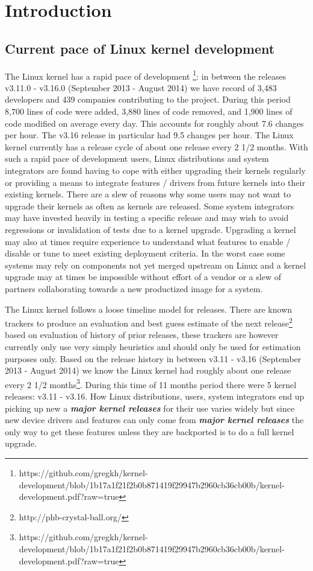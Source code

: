 \section{Introduction}



\subsection{Current pace of Linux kernel development}

The Linux kernel has a rapid pace of development
\footnote{https://github.com/gregkh/kernel-development/blob/1b17a1f21f2b0b871419f29947b2960cb36cb00b/kernel-development.pdf?raw=true}:
in between the releases v3.11.0 - v3.16.0 (September 2013 - August 2014) we
have record of 3,483 developers and 439 companies contributing to the project.
During this period 8,700 lines of code were added, 3,880 lines of code removed,
and 1,900 lines of code modified on average every day. This accounts for
roughly about 7.6 changes per hour. The v3.16 release in particular had 9.5
changes per hour. The Linux kernel currently has a release cycle of about one
release every 2 1/2 months. With such a rapid pace of development users, Linux
distributions and system integrators are found having to cope with either
upgrading their kernels regularly or providing a means to integrate features /
drivers from future kernels into their existing kernels. There are a slew of
reasons why some users may not want to upgrade their kernels as often as
kernels are released. Some system integrators may have invested heavily in
testing a specific release and may wish to avoid regressions or invalidation of
tests due to a kernel upgrade.  Upgrading a kernel may also at times require
experience to understand what features to enable / disable or tune to meet
existing deployment criteria. In the worst case some systems may rely on
components not yet merged upstream on Linux and a kernel upgrade may at times
be impossible without effort of a vendor or a slew of partners collaborating
towards a new productized image for a system.

The Linux kernel follows a loose timeline model for releases. There are known
trackers to produce an evaluation and best guess estimate of the next
release\footnote{http://phb-crystal-ball.org/} based on evaluation of history
of prior releases, these trackers are however currently only use very simply
heuristics and should only be used for estimation purposes only. Based on the
release history in between v3.11 - v3.16  (September 2013 - August 2014) we
know the Linux kernel had roughly about one release every 2 1/2
months\footnote{https://github.com/gregkh/kernel-development/blob/1b17a1f21f2b0b871419f29947b2960cb36cb00b/kernel-development.pdf?raw=true}.
During this time of 11 months period there were 5 kernel releases:
v3.11 - v3.16. How Linux distributions, users, system integrators end up
picking up new a \textbf{\textit{major kernel releases}} for their use varies
widely but since new device drivers and features can only come from
\textbf{\textit{major kernel releases}} the only way to get these features
unless they are backported is to do a full kernel upgrade.

